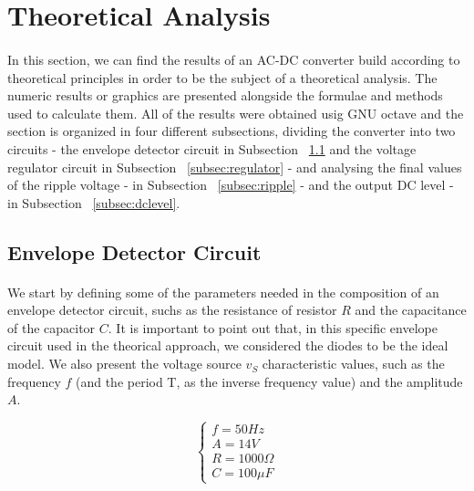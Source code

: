 \section{Theoretical Analysis}
\label{sec:analysis}

\paragraph{}
In this section, we can find the results of an AC-DC converter build according to theoretical principles in order to be the subject of a theoretical analysis. The numeric results or graphics are presented alongside the formulae and methods used to calculate them. All of the results were obtained usig GNU octave and the section is organized in four different subsections, dividing the converter into two circuits - the envelope detector circuit in Subsection ~\ref{subsec:envelope} and the voltage regulator circuit in Subsection ~\ref{subsec:regulator} - and analysing the final values of the ripple voltage - in Subsection ~\ref{subsec:ripple} - and the output DC level - in Subsection ~\ref{subsec:dclevel}.



\subsection{Envelope Detector Circuit}
\label{subsec:envelope}

\paragraph{}
We start by defining some of the parameters needed in the composition of an envelope detector circuit, suchs as the resistance of resistor $R$ and the capacitance of the capacitor $C$. It is important to point out that, in this specific envelope circuit used in the theorical approach, we considered the diodes to be the ideal model. We also present the voltage source $v_S$ characteristic values, such as the frequency $f$ (and the period T, as the inverse frequency value) and the amplitude $A$.

\[
\left\{\begin{matrix}
f = 50 Hz\\
A= 14 V\\
R= 1000 \Omega\\
C=100 \mu F
\end{matrix}\right.
\]

